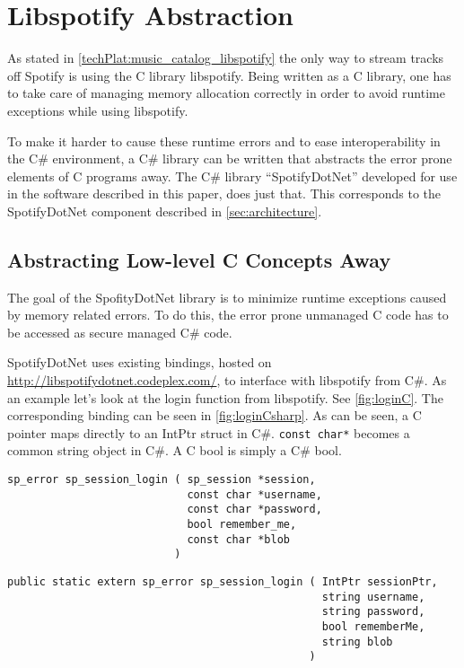 \section{Libspotify Abstraction}
\label{imp:libspotify}
As stated in \cref{techPlat:music_catalog_libspotify} the only way to stream tracks off Spotify is using the C library libspotify. Being written as a C library, one has to take care of managing memory allocation correctly in order to avoid runtime exceptions while using libspotify.

To make it harder to cause these runtime errors and to ease
interoperability in the C\# environment, a C\# library can be written
that abstracts the error prone elements of C programs away. The C\#
library \enquote{SpotifyDotNet} developed for use in the software
described in this paper, does just that. This corresponds to the
SpotifyDotNet component described in \cref{sec:architecture}.

\subsection{Abstracting Low-level C Concepts Away}
\label{libspotify:abstracting_low_level_c_concepts_away}

The goal of the SpofityDotNet library is to minimize runtime exceptions caused by memory related errors. To do this, the error prone unmanaged C code has to be accessed as secure managed C\# code.

SpotifyDotNet uses existing bindings, hosted on \url{http://libspotifydotnet.codeplex.com/}, to interface with libspotify from C\#. As an example let's look at the login function from libspotify. See \cref{fig:loginC}. The corresponding binding can be seen in \cref{fig:loginCsharp}. As can be seen, a C pointer maps directly to an IntPtr struct in C\#. \lstinline|const char*| becomes a common string object in C\#. A C bool is simply a C\# bool.

\begin{lstlisting}[float, floatplacement=htpb,caption = {Libspotify login function prototype - C}, label = {fig:loginC}]
sp_error sp_session_login ( sp_session *session,
                            const char *username,
                            const char *password,
                            bool remember_me,
                            const char *blob
                          )
\end{lstlisting}

\begin{lstlisting}[float, floatplacement=htpb,caption = {Login method using a external implementation from libspotify.dll - C\#}, label={fig:loginCsharp}]
public static extern sp_error sp_session_login ( IntPtr sessionPtr,
                                                 string username,
                                                 string password,
                                                 bool rememberMe,
                                                 string blob
                                               )
\end{lstlisting}

